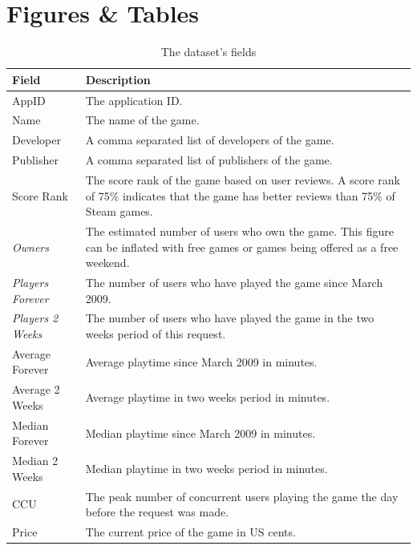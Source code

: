 \documentclass[figures_tabs.tex]{subfiles}
\begin{document}
\section{Figures \& Tables} %
\label{sec:figures_tables}
\begin{table}[H]
    \centering
    \begin{tabularx}{}{|l|X|}
        \hline
        Field & Description \\
        \hline
        AppID & The application ID. \\
        \hline
        Name & The name of the game. \\
        \hline
        Developer & A comma separated list of developers of the game. \\
        \hline
        Publisher & A comma separated list of publishers of the game. \\
        \hline
        Score Rank & The score rank of the game based on user reviews. A score
        rank of 75\% indicates that the game has better reviews than 75\% of
        Steam games. \\
        \hline
        \emph{Owners} & The estimated number of users who own the game. This
        figure can be inflated with free games or games being offered as a free
        weekend. \\
        \hline
        \emph{Players Forever} & The number of users who have played the game
        since March 2009. \\
        \hline
        \emph{Players 2 Weeks} & The number of users who have played the game in
        the two weeks period of this request. \\
        \hline
        Average Forever & Average playtime since March 2009 in minutes.\\
        \hline
        Average 2 Weeks & Average playtime in two weeks period in minutes. \\
        \hline
        Median Forever & Median playtime since March 2009 in minutes. \\
        \hline
        Median 2 Weeks & Median playtime in two weeks period in minutes. \\
        \hline
        CCU & The peak number of concurrent users playing the game the day
        before the request was made. \\
        \hline
        Price & The current price of the game in US cents. \\
        \hline
    \end{tabularx}
    \vspace{1ex}
    \caption{The dataset's fields}
    \label{table:fields}
\end{table}
\end{document}
